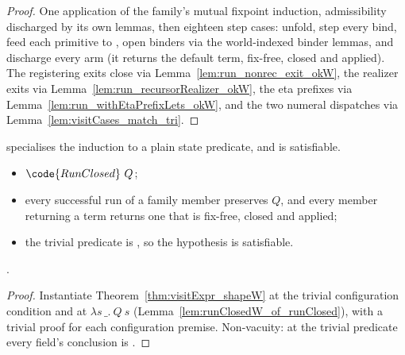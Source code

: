 \begin{proof}
\leanok
{}
 One application of the family's mutual fixpoint induction, admissibility discharged by its
own lemmas, then eighteen step cases: unfold, step every bind, feed each primitive to
, open binders via the world-indexed binder lemmas, and discharge every 
arm (it returns the default term, fix-free, closed and applied). The registering exits close via
Lemma~\ref{lem:run_nonrec_exit_okW}, the realizer exits via Lemma~\ref{lem:run_recursorRealizer_okW},
the eta prefixes via Lemma~\ref{lem:run_withEtaPrefixLets_okW}, and the two numeral dispatches via
Lemma~\ref{lem:visitCases_match_tri}.
\end{proof}
\begin{theorem}
\label{thm:visitExpr_shape}
\leanok
{}
  specialises the induction to a plain state predicate, and is
satisfiable.
\begin{itemize}
\item {} $\code{RunClosed}\ Q$;
\item {} every successful run of a family member preserves $Q$, and every member returning a
term returns one that is fix-free, closed and applied;
\item {} the trivial predicate is , so the hypothesis is satisfiable.
\end{itemize}
 \stProved{}.
\end{theorem}
\begin{proof}
\leanok
{}
 Instantiate Theorem~\ref{thm:visitExpr_shapeW} at the trivial configuration condition and at
$\lambda s\,\_.\ Q\ s$ (Lemma~\ref{lem:runClosedW_of_runClosed}), with a trivial proof for each
configuration premise. Non-vacuity: at the trivial predicate every field's conclusion is .
\end{proof}
